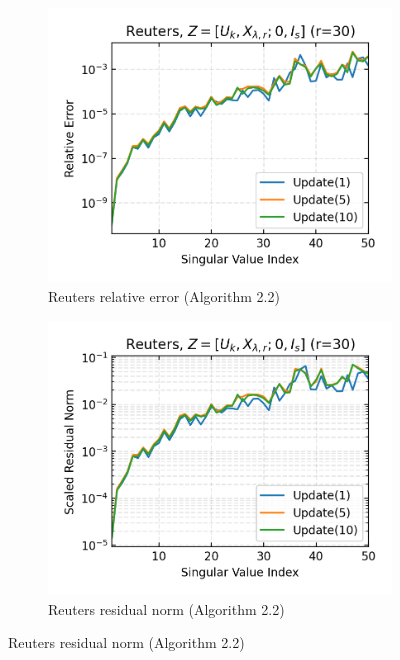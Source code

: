\begin{figure}\ContinuedFloat
  \begin{subfigure}[b]{0.48\textwidth}
    \centering
    \includegraphics[width=\textwidth]{figures/reuters/Reuters_bcg_n_batches_10_k_dims_50_rval_30_rel_err.png}
    \caption{Reuters relative error (Algorithm 2.2)}
  \end{subfigure}
  \hfill
  \begin{subfigure}[b]{0.48\textwidth}
    \centering
    \includegraphics[width=\textwidth]{figures/reuters/Reuters_bcg_n_batches_10_k_dims_50_rval_30_res_norm.png}
    \caption{Reuters residual norm (Algorithm 2.2)}

\end{subfigure}
\end{figure}
